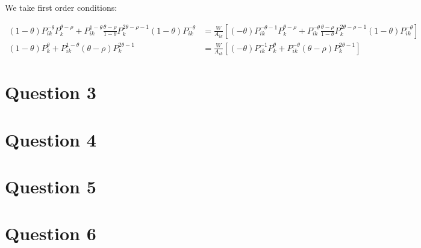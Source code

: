 \documentclass[11pt]{article} %
\begin{document}
We take first order conditions:

\begin{align*}
(1-\theta)P_{ik}^{-\theta}P_k^{\theta - \rho} + P_{ik}^{1-\theta} \frac{\theta - \rho}{1-\theta}P_k^{2\theta - \rho - 1}(1-\theta)P_{ik}^{-\theta} &= \frac{W}{A_{ik}}\left[ (-\theta)P_{ik}^{-\theta-1}P_k^{\theta-\rho} + P_{ik}^{-\theta} \frac{\theta - \rho}{1-\theta} P_k^{2\theta - \rho - 1}(1-\theta)P_{ik}^{-\theta}\right]\\
(1-\theta)P_k^{\theta } + P_{ik}^{1-\theta} (\theta - \rho)P_k^{2\theta  - 1} &= \frac{W}{A_{ik}}\left[ (-\theta)P_{ik}^{-1}P_k^{\theta} + P_{ik}^{-\theta} (\theta - \rho) P_k^{2\theta - 1}\right]
\end{align*}

\section{Question 3}
\section{Question 4}
\section{Question 5}
\section{Question 6}
\end{document}
